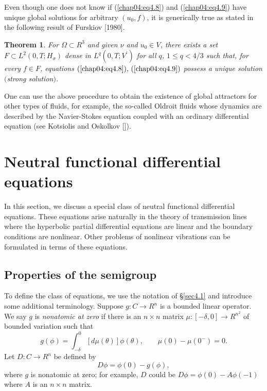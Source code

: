 \documentclass{surv-l}
\theoremstyle{plain}
\newtheorem{theorem}{Theorem}[section]
\theoremstyle{definition}
\numberwithin{equation}{section}
\numberwithin{figure}{chapter}
\begin{document}
Even though one does not know if (\ref{chap04:eq4.8}) and (\ref{chap04:eq4.9}) have unique global solutions for arbitrary $(u_{0}, f)$, it is generically true as stated in the following result of Furskiov [1980].

\begin{theorem}\label{thm4.4.7} For $\Omega\subset R^{3}$ and given $\nu$ and $u_{0}\in V$, there exists a set
$F\subset L^{2}(0, T; H_{\sigma})$ dense in $L^{q}(0, T; V^{\prime})$ for all $q$, $1 \leq q<4/3$ such that, for every $f\in F$, equations $(\ref{chap04:eq4.8}),\, (\ref{chap04:eq4.9})$ possess a unique solution $($strong solution$)$.
\end{theorem}

One can use the above procedure to obtain the existence of global attractors for other types of fluids, for example, the so-called Oldroit fluids whose dynamics are described by the Navier-Stokes equation coupled with an ordinary differential equation (see Kotsiolis and Oskolkov [\citeyear{1986ko}]).

\section{Neutral functional differential equations}\label{sec4.5}

In this section, we discuss a special class of neutral functional differential equations. These equations arise naturally in the theory of transmission lines where the hyperbolic partial differential equations are linear and the boundary conditions are nonlinear. Other problems of nonlinear vibrations can be formulated in terms of these equations.

\subsection{Properties of the semigroup}\label{subsec4.5.1} To define the class of equations, we use the notation of \S \ref{sec4.1} and introduce some additional terminology. Suppose $g\!: C\rightarrow R^{n}$ is a bounded linear operator. We say $g$ is \emph{nonatomic at zero} if there is an $n\times n$ matrix $\mu\!:[-\delta, 0]\rightarrow R^{n^{2}}$ of bounded variation such that
\begin{equation}\label{chap04:eq5.1}
g(\phi)=\int_{-\delta}^{0}[d\mu(\theta)]\phi(\theta),\qquad \mu(0)-\mu(0^{-})=0.
\end{equation}
Let $D: C\rightarrow R^{n}$ be defined by
\begin{equation}\label{chap04:eq5.2}
D\phi =\phi(0)-g(\phi),
\end{equation}
where $g$ is nonatomic at zero; for example, $D$ could be $D\phi =\phi(0)-A\phi(-1)$ where $A$ is an $n\times n$ matrix.
\end{document}
